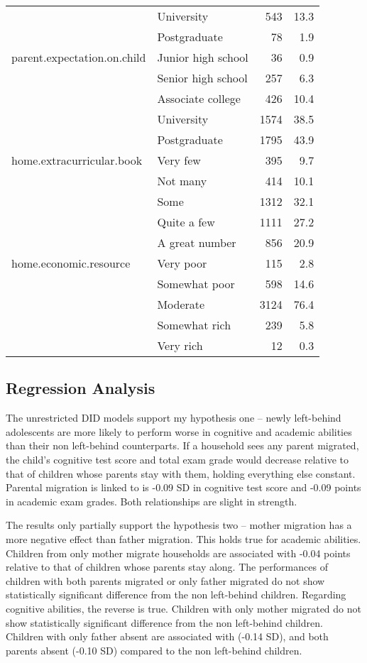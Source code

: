 \documentclass[
  man,floatsintext]{apa7}
\begin{document}
\begin{longtable}[]{@{}llrr@{}}
& University & 543 & 13.3 \\
& Postgraduate & 78 & 1.9 \\
parent.expectation.on.child & Junior high school & 36 & 0.9 \\
& Senior high school & 257 & 6.3 \\
& Associate college & 426 & 10.4 \\
& University & 1574 & 38.5 \\
& Postgraduate & 1795 & 43.9 \\
home.extracurricular.book & Very few & 395 & 9.7 \\
& Not many & 414 & 10.1 \\
& Some & 1312 & 32.1 \\
& Quite a few & 1111 & 27.2 \\
& A great number & 856 & 20.9 \\
home.economic.resource & Very poor & 115 & 2.8 \\
& Somewhat poor & 598 & 14.6 \\
& Moderate & 3124 & 76.4 \\
& Somewhat rich & 239 & 5.8 \\
& Very rich & 12 & 0.3 \\
\bottomrule
\end{longtable}

\hypertarget{regression-analysis}{%
\subsection{Regression Analysis}\label{regression-analysis}}

The unrestricted DID models support my hypothesis one -- newly left-behind adolescents are more likely to perform worse in cognitive and academic abilities than their non left-behind counterparts. If a household sees any parent migrated, the child's cognitive test score and total exam grade would decrease relative to that of children whose parents stay with them, holding everything else constant. Parental migration is linked to is -0.09 SD in cognitive test score and -0.09 points in academic exam grades. Both relationships are slight in strength.

The results only partially support the hypothesis two -- mother migration has a more negative effect than father migration. This holds true for academic abilities. Children from only mother migrate households are associated with -0.04 points relative to that of children whose parents stay along. The performances of children with both parents migrated or only father migrated do not show statistically significant difference from the non left-behind children. Regarding cognitive abilities, the reverse is true. Children with only mother migrated do not show statistically significant difference from the non left-behind children. Children with only father absent are associated with (-0.14 SD), and both parents absent (-0.10 SD) compared to the non left-behind children.
\end{document}
